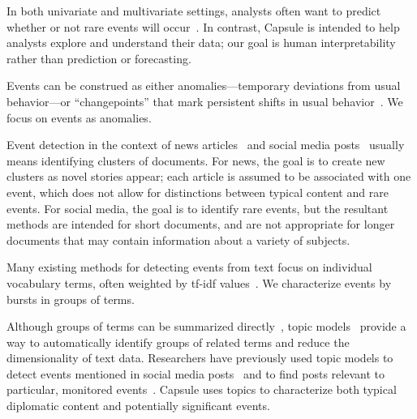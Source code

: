 In both univariate and multivariate settings, analysts often want to
predict whether or not rare events will
occur~\cite{weiss1998learning,das2008anomaly}. In contrast, Capsule is
intended to help analysts explore and understand their data; our goal
is human interpretability rather than prediction or forecasting.

Events can be construed as either anomalies---temporary deviations
from usual behavior---or ``changepoints'' that mark persistent shifts
in usual behavior~\cite{guralnik1999event,adams2007bayesian}. We focus
on events as anomalies.


Event detection in the context of news
articles~\cite{zhao2012novel,zhao2007temporal,zhang2002novelty,li2005probabilistic,wang2007mining,allan1998line}
and social media
posts~\cite{atefeh2015survey,VanDam:2012,lau2012line,jackoway2011identification,sakaki2010earthquake,reuter2012event,becker2010learning,sayyadi2009event}
usually means identifying clusters of documents. For news, the goal is
to create new clusters as novel stories appear; each article is assumed
to be associated with one event, which does not allow for distinctions
between typical content and rare events.
For social media, the goal is
to identify rare events, but the resultant methods are intended for
short documents, and are not appropriate for longer documents that may
contain information about a variety of subjects.

Many existing methods for detecting events from text focus on
individual vocabulary terms, often weighted by tf-idf
values~\cite{fung2005parameter,kumaran2004text,brants2003system,das2011dynamic,zhao2007temporal,zhao2012novel}.
We characterize events by bursts in groups of terms.

Although groups of terms can be summarized
directly~\cite{peng2007event,chakrabarti2011event,gao2012joint}, topic
models~\cite{Blei:2012} provide a way to automatically identify groups
of related terms and reduce the dimensionality of text
data. Researchers have previously used topic models to detect events
mentioned in social media posts~\cite{lau2012line,dou2012leadline} and
to find posts relevant to particular, monitored
events~\cite{VanDam:2012}. Capsule uses topics to characterize both
typical diplomatic content and potentially significant events.

